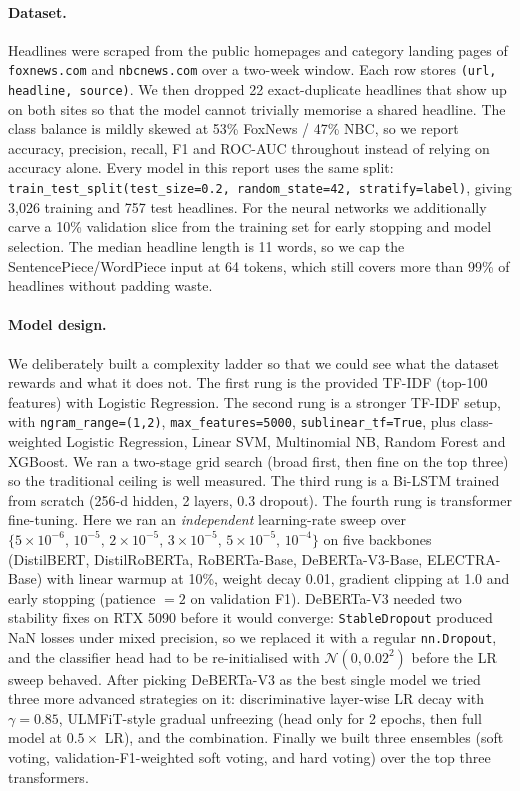 \documentclass[10pt]{article}
\begin{document}
\paragraph{Dataset.} Headlines were scraped from the public homepages and category landing pages of \texttt{foxnews.com} and \texttt{nbcnews.com} over a two-week window. Each row stores \texttt{(url, headline, source)}. We then dropped 22 exact-duplicate headlines that show up on both sites so that the model cannot trivially memorise a shared headline. The class balance is mildly skewed at 53\% FoxNews / 47\% NBC, so we report accuracy, precision, recall, F1 and ROC-AUC throughout instead of relying on accuracy alone. Every model in this report uses the same split: \texttt{train\_test\_split(test\_size=0.2, random\_state=42, stratify=label)}, giving 3{,}026 training and 757 test headlines. For the neural networks we additionally carve a 10\% validation slice from the training set for early stopping and model selection. The median headline length is 11 words, so we cap the SentencePiece/WordPiece input at 64 tokens, which still covers more than 99\% of headlines without padding waste.

\paragraph{Model design.} We deliberately built a complexity ladder so that we could see what the dataset rewards and what it does not. The first rung is the provided TF-IDF (top-100 features) with Logistic Regression. The second rung is a stronger TF-IDF setup, with \texttt{ngram\_range=(1,2)}, \texttt{max\_features=5000}, \texttt{sublinear\_tf=True}, plus class-weighted Logistic Regression, Linear SVM, Multinomial NB, Random Forest and XGBoost. We ran a two-stage grid search (broad first, then fine on the top three) so the traditional ceiling is well measured. The third rung is a Bi-LSTM trained from scratch (256-d hidden, 2 layers, 0.3 dropout). The fourth rung is transformer fine-tuning. Here we ran an \emph{independent} learning-rate sweep over $\{5\!\times\!10^{-6},\,10^{-5},\,2\!\times\!10^{-5},\,3\!\times\!10^{-5},\,5\!\times\!10^{-5},\,10^{-4}\}$ on five backbones (DistilBERT, DistilRoBERTa, RoBERTa-Base, DeBERTa-V3-Base, ELECTRA-Base) with linear warmup at 10\%, weight decay 0.01, gradient clipping at 1.0 and early stopping (patience $=2$ on validation F1). DeBERTa-V3 needed two stability fixes on RTX 5090 before it would converge: \texttt{StableDropout} produced NaN losses under mixed precision, so we replaced it with a regular \texttt{nn.Dropout}, and the classifier head had to be re-initialised with $\mathcal{N}(0,0.02^2)$ before the LR sweep behaved. After picking DeBERTa-V3 as the best single model we tried three more advanced strategies on it: discriminative layer-wise LR decay with $\gamma=0.85$, ULMFiT-style gradual unfreezing (head only for 2 epochs, then full model at $0.5\times$ LR), and the combination. Finally we built three ensembles (soft voting, validation-F1-weighted soft voting, and hard voting) over the top three transformers.
\end{document}
